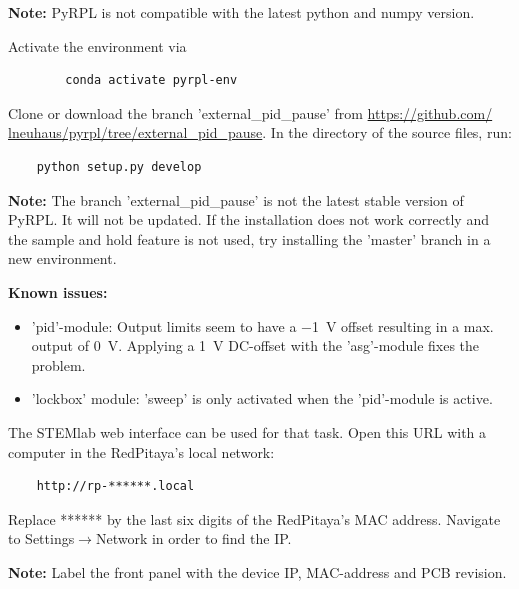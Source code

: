 \documentclass[twoside,a4paper]{refart}
\begin{document}
\textbf{Note:}  PyRPL is not compatible with the latest python and numpy version.

Activate the environment via

\begin{tcolorbox}
	\begin{verbatim}
		conda activate pyrpl-env
	\end{verbatim}
\end{tcolorbox}

Clone or download the branch 'external\_pid\_pause' from \href{https://github.com/lneuhaus/pyrpl/tree/external_pid_pause}{https://github.com/ lneuhaus/pyrpl/tree/external\_pid\_pause}. In the directory of the source files, run:

\begin{tcolorbox}
	\begin{verbatim}
	python setup.py develop
	\end{verbatim}
\end{tcolorbox}

\textbf{Note:} The branch 'external\_pid\_pause' is not the latest stable version of PyRPL. It will not be updated. If the installation does not work correctly and the sample and hold feature is not used, try installing the 'master' branch in a new environment.

\textbf{Known issues:}
\begin{itemize}
	\item 'pid'-module: Output limits seem to have a \qty{-1}{\volt} offset resulting in a max. output of \qty{0}{\volt}. Applying a \qty{1}{\volt} DC-offset with the 'asg'-module fixes the problem.
	\item 'lockbox' module: 'sweep' is only activated when the 'pid'-module is active.
\end{itemize}   

The STEMlab web interface can be used for that task. Open this URL with a computer in the RedPitaya's local network:
\begin{tcolorbox}
	\begin{verbatim}
	http://rp-******.local
	\end{verbatim}
\end{tcolorbox}
Replace ****** by the last six digits of the RedPitaya's MAC address. Navigate to Settings$\rightarrow$Network in order to find the IP.

\textbf{Note:}
Label the front panel with the device IP, MAC-address and PCB revision.
\end{document}
